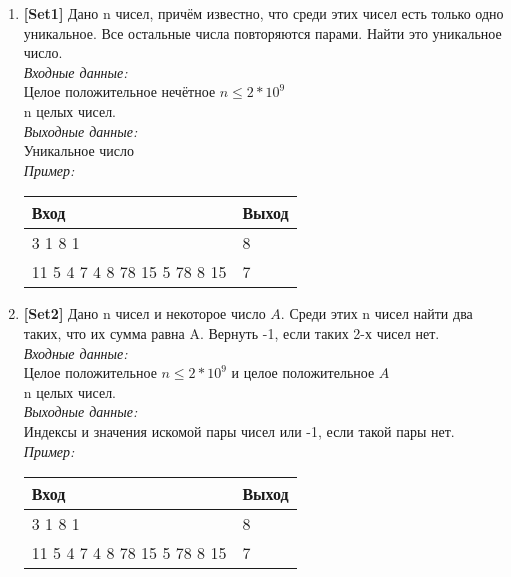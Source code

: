 \documentclass[12pt]{article}
\begin{document}
\begin{enumerate}
\item \textbf{[Set1]} Дано n чисел, причём известно, что среди этих чисел есть только одно уникальное. Все остальные числа повторяются парами. Найти это уникальное число. \\
\null\hspace{1cm}\textit{Входные данные:} \\
\null\hspace{2cm} Целое положительное нечётное $n \le 2 * 10^9$\\
\null\hspace{2cm} n целых чисел.  \\
\null\hspace{1cm} \textit{Выходные данные:} \\
\null\hspace{2cm} Уникальное число \\
\null\hspace{1cm} \textit{Пример:}
\begin{table}[h]
\centering
\begin{tabular}{|l|l|}
\hline
Вход & Выход                                                      \\ \hline
3 1 8 1  & 8  \\ \hline
11 5 4 7 4 8 78 15 5 78 8 15  & 7                                                      \\ \hline
\end{tabular}
\end{table}

\newpage
\item \textbf{[Set2]} Дано n чисел и некоторое число $A$. Среди этих n чисел найти два таких, что их сумма равна A. Вернуть -1, если таких 2-х чисел нет. \\
\null\hspace{1cm}\textit{Входные данные:} \\
\null\hspace{2cm} Целое положительное $n \le 2 * 10^9$ и целое положительное $A$\\
\null\hspace{2cm} n целых чисел.  \\
\null\hspace{1cm} \textit{Выходные данные:} \\
\null\hspace{2cm} Индексы и значения искомой пары чисел или -1, если такой пары нет. \\
\null\hspace{1cm} \textit{Пример:}
\begin{table}[h]
\centering
\begin{tabular}{|l|l|}
\hline
Вход & Выход                                                      \\ \hline
3 1 8 1  & 8  \\ \hline
11 5 4 7 4 8 78 15 5 78 8 15  & 7                                                      \\ \hline
\end{tabular}
\end{table}




\end{enumerate}
\end{document}
